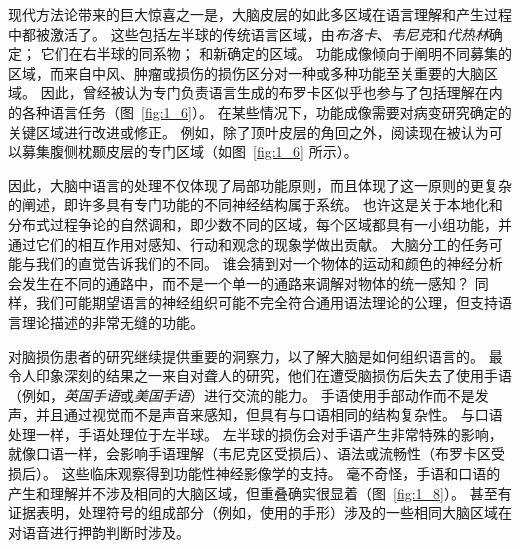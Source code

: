 现代方法论带来的巨大惊喜之一是，大脑皮层的如此多区域在语言理解和产生过程中都被激活了。
这些包括左半球的传统语言区域，由\textit{布洛卡}、\textit{韦尼克}和\textit{代热林}确定； 它们在右半球的同系物；
和新确定的区域。
功能成像倾向于阐明不同募集的区域，而来自中风、肿瘤或损伤的损伤区分对一种或多种功能至关重要的大脑区域。
因此，曾经被认为专门负责语言生成的布罗卡区似乎也参与了包括理解在内的各种语言任务（图~\ref{fig:1_6}）。
在某些情况下，功能成像需要对病变研究确定的关键区域进行改进或修正。
例如，除了顶叶皮层的角回之外，阅读现在被认为可以募集腹侧枕颞皮层的专门区域（如图~\ref{fig:1_6} 所示）。


因此，大脑中语言的处理不仅体现了局部功能原则，而且体现了这一原则的更复杂的阐述，即许多具有专门功能的不同神经结构属于系统。
也许这是关于本地化和分布式过程争论的自然调和，即少数不同的区域，每个区域都具有一小组功能，并通过它们的相互作用对感知、行动和观念的现象学做出贡献。
大脑分工的任务可能与我们的直觉告诉我们的不同。
谁会猜到对一个物体的运动和颜色的神经分析会发生在不同的通路中，而不是一个单一的通路来调解对物体的统一感知？
同样，我们可能期望语言的神经组织可能不完全符合通用语法理论的公理，但支持语言理论描述的非常无缝的功能。


对脑损伤患者的研究继续提供重要的洞察力，以了解大脑是如何组织语言的。
最令人印象深刻的结果之一来自对聋人的研究，他们在遭受脑损伤后失去了使用手语（例如，\textit{英国手语}或\textit{美国手语}）进行交流的能力。
手语使用手部动作而不是发声，并且通过视觉而不是声音来感知，但具有与口语相同的结构复杂性。
与口语处理一样，手语处理位于左半球。 左半球的损伤会对手语产生非常特殊的影响，就像口语一样，会影响手语理解（韦尼克区受损后）、语法或流畅性（布罗卡区受损后）。
这些临床观察得到功能性神经影像学的支持。
毫不奇怪，手语和口语的产生和理解并不涉及相同的大脑区域，但重叠确实很显着（图~\ref{fig:1_8}）。
甚至有证据表明，处理符号的组成部分（例如，使用的手形）涉及的一些相同大脑区域在对语音进行押韵判断时涉及。


